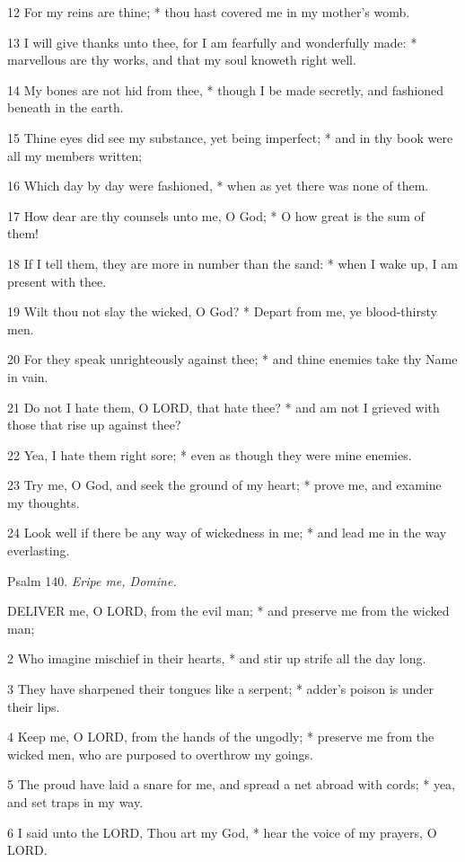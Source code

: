 12 For my reins are thine; * thou hast covered me in
my mother's womb.

13 I will give thanks unto thee, for I am fearfully and
wonderfully made: * marvellous are thy works, and that my soul knoweth right
well.

14 My bones are not hid from thee, * though I be made
secretly, and fashioned beneath in the earth.

15 Thine eyes did see my substance, yet being imperfect;
* and in thy book were all my members written;

16 Which day by day were fashioned, * when as yet there
was none of them.

17 How dear are thy counsels unto me, O God; * O how great is the sum
of them!

18 If I tell them, they are more in number than the
sand: * when I wake up, I am present with thee.

19 Wilt thou not slay the wicked, O God? * Depart from
me, ye blood-thirsty men.

20 For they speak unrighteously against thee; * and
thine enemies take thy Name in vain.

21 Do not I hate them, O LORD, that hate thee? * and
am not I grieved with those that rise up against thee?

22 Yea, I hate them right sore; * even as though they
were mine enemies.

23 Try me, O God, and seek the ground of my heart;
* prove me, and examine my thoughts.

24 Look well if there be any way of wickedness in me;
* and lead me in the way everlasting.

Psalm
140. \emph{Eripe me, Domine.}

DELIVER
me, O LORD, from the evil man; * and preserve me from the wicked man;

2 Who imagine mischief in their hearts, * and stir
up strife all the day long.

3 They have sharpened their tongues like a serpent;
* adder's poison is under their lips.

4 Keep me, O LORD, from the hands of the ungodly; *
preserve me from the wicked men, who are purposed to overthrow my goings.

5 The proud have laid a snare for me, and spread a
net abroad with cords; * yea, and set traps in my way.

6 I said unto the LORD, Thou art my God, * hear the
voice of my prayers, O LORD.

